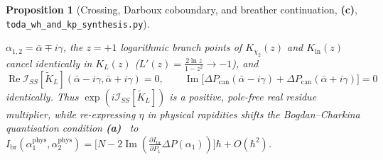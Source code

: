 \documentclass[11pt,a4paper]{article}
\newcommand{\La}{\textsf{\textbf{(a)}}}
\newcommand{\Lc}{\textsf{\textbf{(c)}}}
\newcommand{\scrshort}{\texttt{toda\_\allowbreak wh\_\allowbreak and\_\allowbreak kp\_\allowbreak synthesis.py}}
\newtheorem{proposition}[theorem]{Proposition}
\theoremstyle{remark}
\begin{document}
\begin{proposition}[Crossing, Darboux coboundary, and breather continuation, \Lc, \scrshort]
\begin{enumerate}
  $\alpha_{1,2} = \bar{\alpha} \mp i\gamma$, the $z = +1$ logarithmic branch points of $K_{\chi_2}(z)$
  and $K_{\ln}(z)$ cancel identically in $K_L(z)$ ($L'(z) = \frac{2\ln z}{1-z^2} \to -1$), and
  \begin{equation}
    \operatorname{Re}\mathcal{I}_{SS}[\widetilde{K}_L](\bar{\alpha}-i\gamma,\bar{\alpha}+i\gamma) = 0, \qquad
    \operatorname{Im}\big[\Delta P_{\mathrm{can}}(\bar{\alpha}-i\gamma) + \Delta P_{\mathrm{can}}(\bar{\alpha}+i\gamma)\big] = 0
  \end{equation}
  identically. Thus $\exp(i\mathcal{I}_{SS}[\widetilde{K}_L])$ is a positive, pole-free real residue
  multiplier, while re-expressing $\eta$ in physical rapidities shifts the Bogdan--Charkina
  quantisation condition \La~\cite{BC} to
  $I_{\mathrm{br}}(\alpha_1^{\mathrm{phys}},\alpha_2^{\mathrm{phys}}) = \big[N - 2\operatorname{Im}(\frac{\partial I_{\mathrm{br}}}{\partial P_1}\Delta P(\alpha_1))\big]\hbar + O(\hbar^2)$.
\end{enumerate}
\end{proposition}
\end{document}
